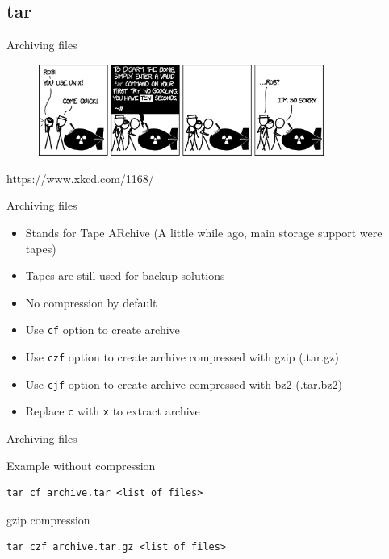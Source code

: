 \subsection{tar}

\begin{frame}[fragile]{Archiving files}
  \begin{figure}[!h]
    \includegraphics[height=3cm]{img/tar_2x.png}
  \end{figure}
  https://www.xkcd.com/1168/
\end{frame}

\begin{frame}[fragile]{Archiving files}
  \begin{itemize}
    \pause \item Stands for Tape ARchive (A little while ago, main storage support were tapes)
    \pause \item Tapes are still used for backup solutions
    \pause \item No compression by default
    \pause \item Use \texttt{cf} option to create archive
    \pause \item Use \texttt{czf} option to create archive compressed with gzip (.tar.gz)
    \pause \item Use \texttt{cjf} option to create archive compressed with bz2 (.tar.bz2)
    \pause \item Replace \texttt{c} with \texttt{x} to extract archive
  \end{itemize}
\end{frame}

\begin{frame}[fragile]{Archiving files}
  \begin{exampleblock}{Example without compression}
    \begin{lstlisting}[showstringspaces=false]
tar cf archive.tar <list of files>
    \end{lstlisting}
  \end{exampleblock}
  \pause

  \begin{exampleblock}{gzip compression}
    \begin{lstlisting}[showstringspaces=false]
tar czf archive.tar.gz <list of files>
    \end{lstlisting}
  \end{exampleblock}
\end{frame}
